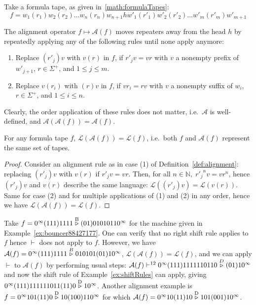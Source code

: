 \begin{definition}\label{def:alignment}
    Take a formula tape, as given in~\eqref{math:formulaTapes}: $$f = w_1(r_1)w_2(r_2)\dots w_n(r_n) w_{n+1} h w'_1(r'_1)w'_2(r'_2)\dots w'_m(r'_m) w'_{m+1}$$

    The alignment operator $f \mapsto \mathcal{A}(f)$ moves repeaters away from the head $h$ by repeatedly applying any of the following rules until none apply anymore:
    \begin{enumerate}
        \item Replace $(r'_{j})v$ with $v(r)$ in $f$, if $r'_j v = v r$ with $v$ a nonempty prefix of $w'_{j+1}$, $r\in\Sigma^+$, and $1 \leq j \leq m$.

        \item Replace $v(r_{i})$ with $(r)v$ in $f$, if $v r_i = r v$ with $v$ a nonempty suffix of $w_{i}$, $r\in\Sigma^+$, and $1 \leq i \leq n$.
    \end{enumerate}

    Clearly, the order application of these rules does not matter, i.e.\ $\mathcal{A}$ is well-defined, and $\mathcal{A}(\mathcal{A}(f)) = \mathcal{A}(f)$.
\end{definition}



\begin{lemma}\label{lem:sameLanguage} For any formula tape $f$, $\mathcal{L}(\mathcal{A}(f)) = \mathcal{L}(f)$, i.e.\ both $f$ and $\mathcal{A}(f)$ represent the same set of tapes.
\end{lemma}

\begin{proof}
    Consider an alignment rule as in case (1) of Definition~\ref{def:alignment}: replacing $(r'_{j})v$ with $v(r)$ if $r'_j v = v r$. Then, for all $n\in\mathbb{N},\; {r'_j}^n v = v r^n$, hence $(r'_{j})v$ and $v(r)$ describe the same language: $\mathcal{L}((r'_{j})v) = \mathcal{L}(v(r))$. Same for case (2) and for multiple applications of (1) and (2) in any order, hence we have $\mathcal{L}(\mathcal{A}(f)) = \mathcal{L}(f)$.
\end{proof}

\begin{example}\label{ex:alignment}
    Take $f=0^\infty(111)1111\stackrel{\text{B}}\triangleright(01)01010110^\infty$ for the machine given in Example~\ref{ex:bouncer88427177}. One can verify that no right shift rule applies to $f$ hence $\vdash$ does not apply to $f$. However, we have $ \mathcal{A}(f)=0^\infty(111)1111\stackrel{B}\triangleright010101(01)10^\infty$, $\mathcal{L}(\mathcal{A}(f)) = \mathcal{L}(f)$, and we can apply $\vdash$ to $ \mathcal{A}(f)$ by performing usual steps: $ \mathcal{A}(f) \vdash^{12} 0^\infty(111)1111110110 \stackrel{D}\triangleright (01)10^\infty$ and now the shift rule of Example~\ref{ex:shiftRules} can apply, giving $0^\infty(111)111111011(11)0 \stackrel{\text{D}}\triangleright 10^\infty$.
    Another alignment example is $f=0^\infty 101(11)0 \stackrel{\text{D}}\triangleright 10 (100) 11 0^\infty$ for which $\mathcal{A}(f) = 0^\infty 10(11)10 \stackrel{\text{D}}\triangleright 101(001)10^\infty$.
\end{example}

